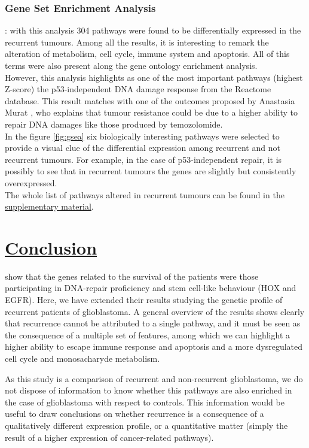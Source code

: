 \documentclass[9pt,twocolumn,twoside]{gsajnl}
\begin{document}
\subsubsection*{Gene Set Enrichment Analysis}: with this analysis 304 pathways were found to be differentially expressed in the recurrent tumours. Among all the results, it is interesting to remark the alteration of metabolism, cell cycle, immune system and apoptosis. All of this terms were also present along the gene ontology enrichment analysis.\\
However, this analysis highlights as one of the most important pathways (highest Z-score) the p53-independent DNA damage response from the Reactome database. This result matches with one of the outcomes proposed by Anastasia Murat \citep{Murat2008}, who explains that tumour resistance could be due to a higher ability to repair DNA damages like those produced by temozolomide.\\
In the figure \ref{fig:gsea} six biologically interesting pathways were selected to provide a visual clue of the differential expression among recurrent and not recurrent tumours. For example, in the case of p53-independent repair, it is possibly to see that in recurrent tumours the genes are slightly but consistently overexpressed.\\
The whole list of pathways altered in recurrent tumours can be found in the \href{http://ieoproject.tk/ieo/abella_casals_miravet.html}{supplementary material}.

\section*{\underline{Conclusion}}
\cite{Murat2008} show that the genes related to the survival of the patients were those participating in DNA-repair proficiency and stem cell-like behaviour (HOX and EGFR). Here, we have extended their results studying the genetic profile of recurrent patients of glioblastoma. A general overview of the results shows clearly that recurrence cannot be attributed to a single pathway, and it must be seen as the consequence of a multiple set of features, among which we can highlight a higher ability to escape immune response and apoptosis and a more dysregulated cell cycle and monosacharyde metabolism.

As this study is a comparison of recurrent and non-recurrent glioblastoma, we do not dispose of information to know whether this pathways are also enriched in the case of glioblastoma with respect to controls. This information would be useful to draw conclusions on whether recurrence is a consequence of a qualitatively different expression profile, or a quantitative matter (simply the result of a higher expression of cancer-related pathways).
\end{document}
